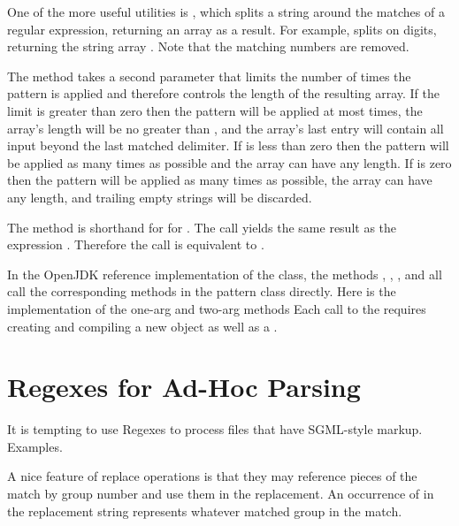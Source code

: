 One of the more useful utilities is , which splits
a string around the matches of a regular expression, returning an
array as a result.  For example,
 splits on digits, returning
the string array .  Note that the
matching numbers are removed.

The method 
takes a second  parameter that limits the number of
times the pattern is applied and therefore controls the length of the
resulting array.  If the limit  is greater than zero then
the pattern will be applied at most  times, the array's length
will be no greater than , and the array's last entry will contain all
input beyond the last matched delimiter. If  is less than zero
then the pattern will be applied as many times as possible and the array can
have any length. If  is zero then the pattern will be applied as many
times as possible, the array can have any length, and trailing empty
strings will be discarded.  

The method  is shorthand for for .
The call  yields the same result as the expression
. 
Therefore the call  
is equivalent to 
.

In the OpenJDK reference implementation of the  class,
the methods , , ,
and  all call the corresponding methods in the pattern class
directly.
Here is the implementation of the one-arg and two-arg  methods
%
%
Each call to the  requires creating and compiling
a new  object as well as a .





\section{Regexes for Ad-Hoc Parsing}\label{section:adhoc-parser}

It is tempting to use Regexes to process files that have SGML-style markup.
Examples.


A nice feature of replace operations is that they may reference
pieces of the match by group number and use them in the replacement.
An occurrence of  in the replacement string
represents whatever matched group  in the match.

